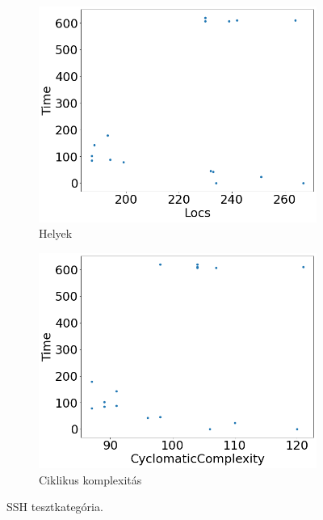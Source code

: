 \begin{figure}[ht]
\begin{subfigure}[b]{0.5\linewidth}
		\includegraphics[width=0.95\linewidth]{figures/ssh/locs.png} 
		\caption{Helyek} 
	\end{subfigure}%
	\begin{subfigure}[b]{0.5\linewidth}
		\centering
		\includegraphics[width=0.95\linewidth]{figures/ssh/cc.png} 
		\caption{Ciklikus komplexitás} 
	\end{subfigure} 
	\caption{SSH tesztkategória.}
	\label{fig_ssh} 
\end{figure}

